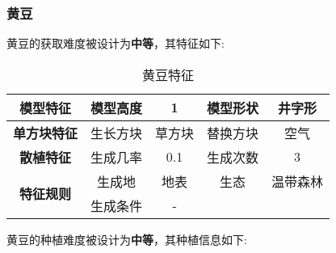 \subsubsection{黄豆}

黄豆的获取难度被设计为\textbf{中等}，其特征如下:
\begin{table}[H]
    \centering
    \caption{黄豆特征}
    \label{table:黄豆特征}
    \setlength{\tabcolsep}{4mm}
    \begin{tabular}{c|cc|cc}
        \toprule
        \textbf{模型特征}                  & 模型高度 & 1      & 模型形状 & 井字形 \\
        \midrule
        \textbf{单方块特征}                & 生长方块 & 草方块 & 替换方块 & 空气   \\
        \midrule
        \textbf{散植特征}                  & 生成几率 & 0.1    & 生成次数 & 3      \\
        \midrule
        \multirow{2}{*}{\textbf{特征规则}} & 生成地   & 地表   & 生态     & 温带森林   \\
                                           & 生成条件 & -              \\
        \bottomrule
    \end{tabular}
\end{table}


黄豆的种植难度被设计为\textbf{中等}，其种植信息如下:

